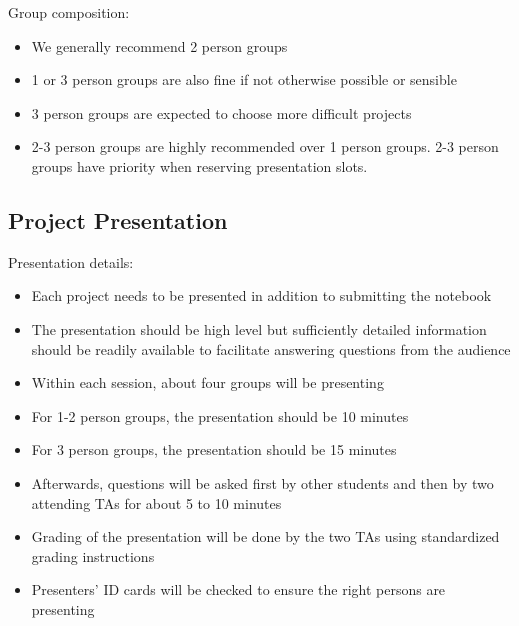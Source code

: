 \documentclass[a4paper,11pt]{article}
\begin{document}
Group composition:
\begin{itemize}
  \item We generally recommend 2 person groups
  \item 1 or 3 person groups are also fine if not otherwise possible or sensible
  \item 3 person groups are expected to choose more difficult projects
  \item 2-3 person groups are highly recommended over 1 person groups. 2-3 person groups have priority when reserving presentation slots.
\end{itemize}

\subsection*{Project Presentation}

Presentation details:
\begin{itemize}
  \item Each project needs to be presented in addition to submitting the notebook
  \item The presentation should be high level but sufficiently detailed information should be readily available to facilitate answering questions from the audience
  \item Within each session, about four groups will be presenting
  \item For 1-2 person groups, the presentation should be 10 minutes
  \item For 3 person groups, the presentation should be 15 minutes 
  \item Afterwards, questions will be asked first by other students and then by two attending TAs for about 5 to 10 minutes
  \item Grading of the presentation will be done by the two TAs using standardized grading instructions
  \item Presenters' ID cards will be checked to ensure the right persons are presenting
\end{itemize}
\end{document}
